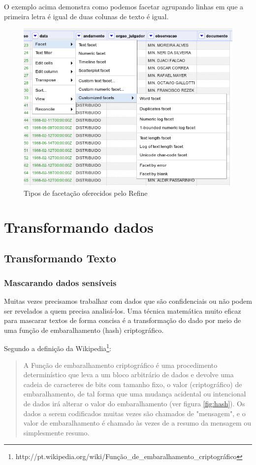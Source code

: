 \documentclass[a4paper,10pt]{report}
\begin{document}
O exemplo acima demonstra como podemos facetar agrupando linhas em que a primeira letra é igual de duas colunas de texto é igual.

\begin{figure}[h!]
 \includegraphics[width=12cm]{./tipos_facet.png}
 \caption{Tipos de facetação oferecidos pelo Refine}
 \label{fig:type_facet}
\end{figure}



\chapter{Transformando dados}

\section{Transformando Texto}
\subsection{Mascarando dados sensíveis}
Muitas vezes precisamos trabalhar com dados que são confidenciais ou não podem ser revelados a quem precisa analisá-los. Uma técnica matemática  muito eficaz para mascarar textos de forma concisa é a transformação do dado por meio de uma função de embaralhamento (hash) criptográfico.

Segundo a definição da Wikipedia\footnote{http://pt.wikipedia.org/wiki/Função\_de\_embaralhamento\_criptográfico}:

\begin{quote}
A Função de embaralhamento criptográfico é uma procedimento determinístico que leva a um bloco arbitrário de dados e devolve uma cadeia de caracteres de bits com tamanho fixo, o valor (criptográfico) de embaralhamento, de tal forma que uma mudança acidental ou intencional de dados irá alterar o valor do embaralhamento (ver figura \ref{fig:hash}). Os dados a serem codificados muitas vezes são chamados de "mensagem", e o valor de embaralhamento é chamado às vezes de a resumo da mensagem ou simplesmente resumo.\end{quote}
\end{document}
